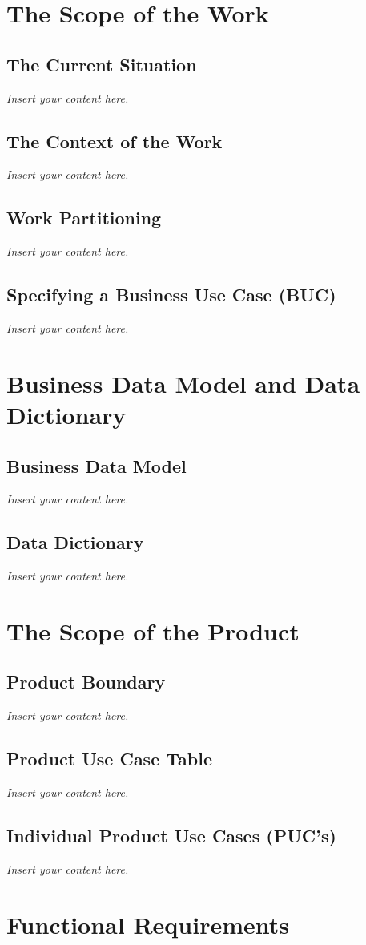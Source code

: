 \documentclass[12pt]{article}
\newcommand{\lips}{\textit{Insert your content here.}}
\begin{document}
\section{The Scope of the Work}
\subsection{The Current Situation}
\lips
\subsection{The Context of the Work}
\lips
\subsection{Work Partitioning}
\lips
\subsection{Specifying a Business Use Case (BUC)}
\lips

\section{Business Data Model and Data Dictionary}
\subsection{Business Data Model}
\lips
\subsection{Data Dictionary}
\lips

\section{The Scope of the Product}
\subsection{Product Boundary}
\lips
\subsection{Product Use Case Table}
\lips
\subsection{Individual Product Use Cases (PUC's)}
\lips


\section{Functional Requirements}
\end{document}
